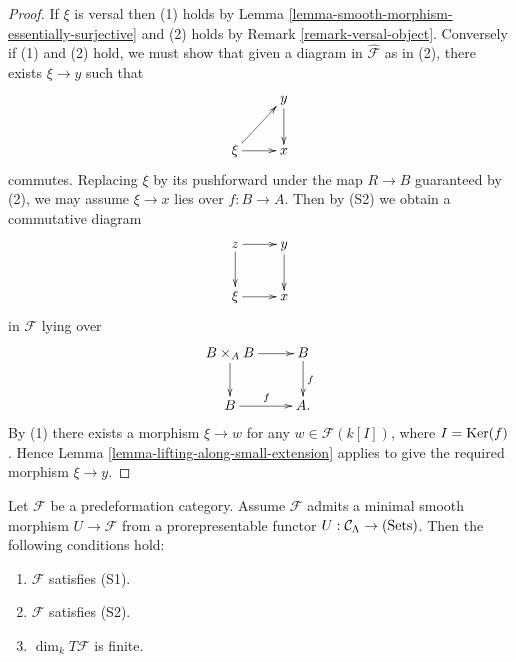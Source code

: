 \begin{proof}
If $\xi$ is versal then (1) holds by Lemma 
\ref{lemma-smooth-morphism-essentially-surjective} and (2) holds by Remark 
\ref{remark-versal-object}.  Conversely if (1) and (2) hold, we must show that 
given a diagram in $\widehat{\mathcal F}$ as in (2), there exists $\xi 
\rightarrow y$ such that
\[
\xymatrix{
            &  y \ar[d] \\
\xi \ar[ur] \ar[r]  &  x
}
\]
commutes. Replacing $\xi$ by its pushforward under the map $R \rightarrow B$ 
guaranteed by (2), we may assume $\xi \rightarrow x$ lies over $f: B 
\rightarrow A$.  Then by (S2) we obtain a commutative diagram
\[
\xymatrix{
z  \ar[r] \ar[d]          &  y \ar[d] \\
\xi \ar[r]  &  x
}
\]
in $\mathcal F$ lying over
\[
\xymatrix{
B \times_{A} B \ar[d] \ar[r] &   B  \ar[d]^{f} \\
B \ar[r]^{f} &   A .
}
\]
By (1) there exists a morphism $\xi \rightarrow w$ for any $w \in \mathcal 
F(k[I])$, where $I = \textnormal{Ker}(f)$.  Hence Lemma 
\ref{lemma-lifting-along-small-extension} applies to give the required morphism 
$\xi \rightarrow y$. 
\end{proof}

\begin{lemma}
\label{lemma-miniversal-object-existence-1}
Let $\mathcal F$ be a predeformation category.  Assume $\mathcal F$ admits a 
minimal smooth morphism $U \rightarrow \mathcal F$ from a prorepresentable 
functor $U: \mathcal C_{\Lambda} \rightarrow \textnormal{(Sets)}$.  Then the 
following conditions hold:
\begin{enumerate}
\item $\mathcal F$ satisfies \textnormal{(S1)}.
\item $\mathcal F$ satisfies \textnormal{(S2)}.
\item $\dim_{k} T\mathcal F$ is finite.
\end{enumerate}
\end{lemma}

